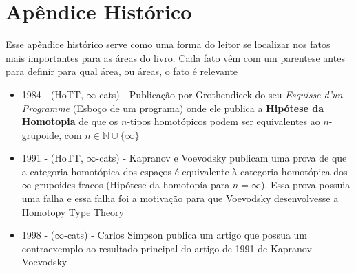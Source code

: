 \documentclass[../main.tex]{subfiles}
\begin{document}
\section{Apêndice Histórico}

Esse apêndice histórico serve como uma forma do leitor se localizar nos fatos mais importantes para as áreas do livro. Cada fato vêm com um parentese antes para definir para qual área, ou áreas, o fato é relevante

\begin{itemize}
    \item 1984 - (HoTT, $\infty$-cats) - Publicação por Grothendieck do seu \emph{Esquisse d'un Programme} (Esboço de um programa) onde ele publica a \textbf{Hipótese da Homotopia} de que os $n$-tipos homotópicos podem ser equivalentes ao $n$-grupoide, com $n \in \mathbb{N} \cup \{\infty\}$ 
    \item 1991 - (HoTT, $\infty$-cats) - Kapranov e Voevodsky publicam uma prova de que a categoria homotópica dos espaços é equivalente à categoria homotópica dos $\infty$-grupoides fracos (Hipótese da homotopía para $n = \infty$). Essa prova possuia uma falha e essa falha foi a motivação para que Voevodsky desenvolvesse a Homotopy Type Theory
    \item 1998 - ($\infty$-cats) - Carlos Simpson publica um artigo que possua um contraexemplo ao resultado principal do artigo de 1991 de Kapranov-Voevodsky
\end{itemize}
\end{document}
